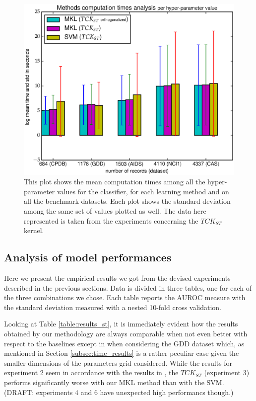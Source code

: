 \begin{figure}[ht]
    \centering
    \includegraphics[scale=0.7]{Figures/method_times_avgstd}
    \caption{
        This plot shows the mean computation times among all the hyper-parameter values
        for the classifier, for each learning method and on all the benchmark datasets.
        Each plot shows the standard deviation among the same set of values plotted as well.
        The data here represented is taken from the experiments concerning the $TCK_{ST}$ kernel.
    }
        \label{fig:meantimes}
\end{figure}

\subsection{Analysis of model performances}

Here we present the empirical results we got from the devised experiments described
in the previous sections.
Data is divided in three tables, one for each of the three combinations we chose.
Each table reports the AUROC measure with the standard deviation measured with
a nested 10-fold cross validation.

Looking at Table \ref{table:results_st}, it is immediately evident how the results
obtained by our methodology are always comparable when not even better with respect
to the baselines except in when considering the GDD dataset which, as mentioned in
Section \ref{subsec:time_results} is a rather peculiar case given the smaller dimensions
of the parameters grid considered.
While the results for experiment 2 seem in accordance with the results in \cite{gmkl},
the $TCK_{ST}$ (experiment 3) performs significantly worse with our MKL method than with
the SVM.
(DRAFT: experiments 4 and 6 have unexpected high performancs though.)

